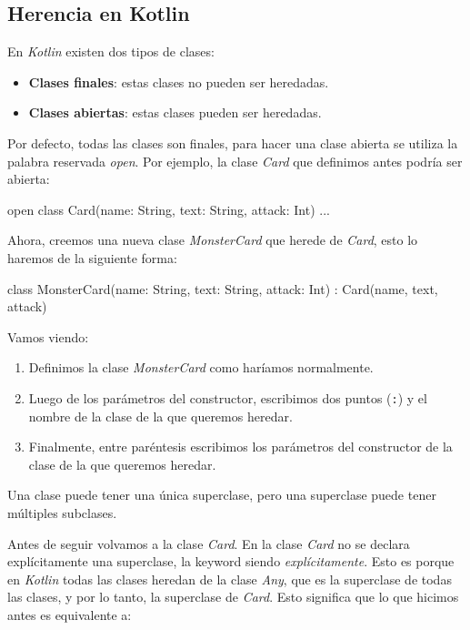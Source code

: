 
\subsection{Herencia en Kotlin}
  En \textit{Kotlin} existen dos tipos de clases:

  \begin{itemize}
    \item \textbf{Clases finales}: estas clases no pueden ser heredadas.
    \item \textbf{Clases abiertas}: estas clases pueden ser heredadas.
  \end{itemize}

  Por defecto, todas las clases son finales, para hacer una clase abierta se utiliza la palabra
  reservada \textit{open}.
  Por ejemplo, la clase \textit{Card} que definimos antes podría ser abierta:

  \begin{kotlin}
    open class Card(name: String, text: String, attack: Int) {...} 
  \end{kotlin}

  Ahora, creemos una nueva clase \textit{MonsterCard} que herede de \textit{Card}, esto lo haremos
  de la siguiente forma:
                        
  \begin{kotlin}
    class MonsterCard(name: String, text: String, attack: Int) : Card(name, text, attack) {
    }
  \end{kotlin}

  Vamos viendo:
  \begin{enumerate}
    \item Definimos la clase \textit{MonsterCard} como haríamos normalmente.
    \item Luego de los parámetros del constructor, escribimos dos puntos (\texttt{:}) y el nombre
      de la clase de la que queremos heredar.
    \item Finalmente, entre paréntesis escribimos los parámetros del constructor de la clase
      de la que queremos heredar.
  \end{enumerate}

  \begin{important}
    Una clase puede tener una única superclase, pero una superclase puede tener múltiples
    subclases.
  \end{important}

  Antes de seguir volvamos a la clase \textit{Card}.
  En la clase \textit{Card} no se declara explícitamente una superclase, la keyword siendo 
  \textit{explícitamente}.
  Esto es porque en \textit{Kotlin} todas las clases heredan de la clase 
  \textit{Any}\autocite*{BuiltinTypesTheira}, que es la superclase de todas las clases, y por lo 
  tanto, la superclase de \textit{Card}.
  Esto significa que lo que hicimos antes es equivalente a:

